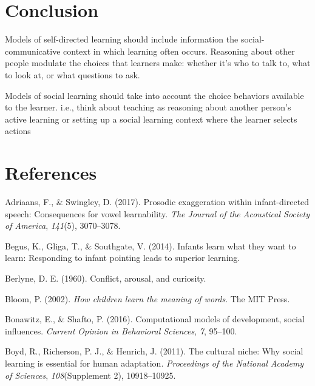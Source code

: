 \documentclass[a4paper,man,apacite,floatsintext]{apa6}
\begin{document}
\section{Conclusion}\label{conclusion}

Models of self-directed learning should include information the
social-communicative context in which learning often occurs. Reasoning
about other people modulate the choices that learners make: whether it's
who to talk to, what to look at, or what questions to ask.

Models of social learning should take into account the choice behaviors
available to the learner. i.e., think about teaching as reasoning about
another person's active learning or setting up a social learning context
where the learner selects actions

\newpage

\section{References}\label{references}

\setlength{\parindent}{-0.4in} \setlength{\leftskip}{0.125in} \noindent

\hypertarget{refs}{}
\hypertarget{ref-adriaans2017prosodic}{}
Adriaans, F., \& Swingley, D. (2017). Prosodic exaggeration within
infant-directed speech: Consequences for vowel learnability. \emph{The
Journal of the Acoustical Society of America}, \emph{141}(5),
3070--3078.

\hypertarget{ref-begus2014infants}{}
Begus, K., Gliga, T., \& Southgate, V. (2014). Infants learn what they
want to learn: Responding to infant pointing leads to superior learning.

\hypertarget{ref-berlyne1960conflict}{}
Berlyne, D. E. (1960). Conflict, arousal, and curiosity.

\hypertarget{ref-bloom2002children}{}
Bloom, P. (2002). \emph{How children learn the meaning of words}. The
MIT Press.

\hypertarget{ref-bonawitz2016computational}{}
Bonawitz, E., \& Shafto, P. (2016). Computational models of development,
social influences. \emph{Current Opinion in Behavioral Sciences},
\emph{7}, 95--100.

\hypertarget{ref-boyd2011cultural}{}
Boyd, R., Richerson, P. J., \& Henrich, J. (2011). The cultural niche:
Why social learning is essential for human adaptation. \emph{Proceedings
of the National Academy of Sciences}, \emph{108}(Supplement 2),
10918--10925.
\end{document}
